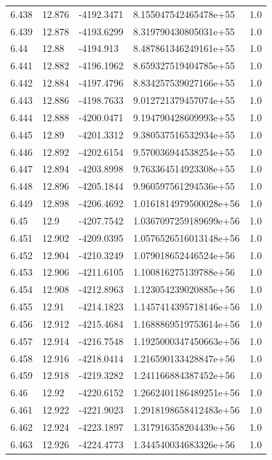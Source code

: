 \begin{tabular}{lllll}
6.438 & 12.876 & -4192.3471 & 8.155047542465478e+55 & 1.0 \\
6.439 & 12.878 & -4193.6299 & 8.319790430805031e+55 & 1.0 \\
6.44 & 12.88 & -4194.913 & 8.487861346249161e+55 & 1.0 \\
6.441 & 12.882 & -4196.1962 & 8.659327519404785e+55 & 1.0 \\
6.442 & 12.884 & -4197.4796 & 8.834257539027166e+55 & 1.0 \\
6.443 & 12.886 & -4198.7633 & 9.012721379457074e+55 & 1.0 \\
6.444 & 12.888 & -4200.0471 & 9.194790428609993e+55 & 1.0 \\
6.445 & 12.89 & -4201.3312 & 9.380537516532934e+55 & 1.0 \\
6.446 & 12.892 & -4202.6154 & 9.570036944538254e+55 & 1.0 \\
6.447 & 12.894 & -4203.8998 & 9.763364514923308e+55 & 1.0 \\
6.448 & 12.896 & -4205.1844 & 9.960597561294536e+55 & 1.0 \\
6.449 & 12.898 & -4206.4692 & 1.0161814979500028e+56 & 1.0 \\
6.45 & 12.9 & -4207.7542 & 1.0367097259189699e+56 & 1.0 \\
6.451 & 12.902 & -4209.0395 & 1.0576526516013148e+56 & 1.0 \\
6.452 & 12.904 & -4210.3249 & 1.079018652446524e+56 & 1.0 \\
6.453 & 12.906 & -4211.6105 & 1.100816275139788e+56 & 1.0 \\
6.454 & 12.908 & -4212.8963 & 1.123054239020885e+56 & 1.0 \\
6.455 & 12.91 & -4214.1823 & 1.1457414395718146e+56 & 1.0 \\
6.456 & 12.912 & -4215.4684 & 1.1688869519753614e+56 & 1.0 \\
6.457 & 12.914 & -4216.7548 & 1.1925000347450663e+56 & 1.0 \\
6.458 & 12.916 & -4218.0414 & 1.216590133428847e+56 & 1.0 \\
6.459 & 12.918 & -4219.3282 & 1.241166884387452e+56 & 1.0 \\
6.46 & 12.92 & -4220.6152 & 1.2662401186489251e+56 & 1.0 \\
6.461 & 12.922 & -4221.9023 & 1.2918198658412483e+56 & 1.0 \\
6.462 & 12.924 & -4223.1897 & 1.317916358204439e+56 & 1.0 \\
6.463 & 12.926 & -4224.4773 & 1.344540034683326e+56 & 1.0 \\

\end{tabular}

